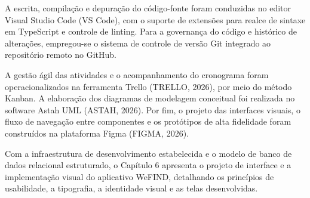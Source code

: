 A escrita, compilação e depuração do código-fonte foram conduzidas no editor Visual Studio Code (VS Code), com o suporte de extensões para realce de sintaxe em TypeScript e controle de linting. Para a governança do código e histórico de alterações, empregou-se o sistema de controle de versão Git integrado ao repositório remoto no GitHub.

A gestão ágil das atividades e o acompanhamento do cronograma foram operacionalizados na ferramenta Trello (TRELLO, 2026), por meio do método Kanban. A elaboração dos diagramas de modelagem conceitual foi realizada no software Astah UML (ASTAH, 2026). Por fim, o projeto das interfaces visuais, o fluxo de navegação entre componentes e os protótipos de alta fidelidade foram construídos na plataforma Figma (FIGMA, 2026).

Com a infraestrutura de desenvolvimento estabelecida e o modelo de banco de dados relacional estruturado, o Capítulo 6 apresenta o projeto de interface e a implementação visual do aplicativo WeFIND, detalhando os princípios de usabilidade, a tipografia, a identidade visual e as telas desenvolvidas.
\clearpage
